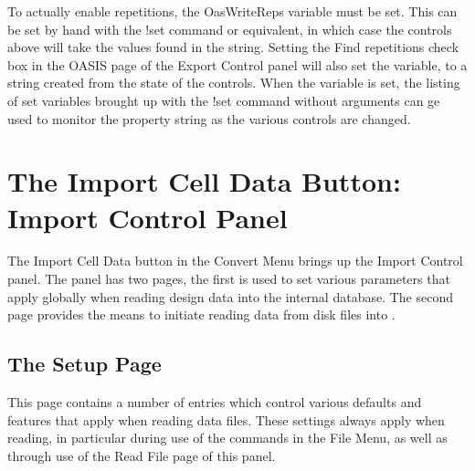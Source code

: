 To actually enable repetitions, the {\et OasWriteReps} variable must
be set.  This can be set by hand with the {\cb !set} command or
equivalent, in which case the controls above will take the values
found in the string.  Setting the {\cb Find repetitions} check box in
the {\cb OASIS} page of the {\cb Export Control} panel will also set
the variable, to a string created from the state of the controls. 
When the variable is set, the listing of set variables brought up with
the {\cb !set} command without arguments can ge used to monitor the
property string as the various controls are changed.


\section{The {\cb Import Cell Data} Button: {\cb Import Control} Panel}
\label{cvimport}

The {\cb Import Cell Data} button in the {\cb Convert Menu} brings
up the {\cb Import Control} panel.  The panel has two pages, the first
is used to set various parameters that apply globally when reading
design data into the {\Xic} internal database.  The second page
provides the means to initiate reading data from disk files into
{\Xic}.

\subsection{The {\cb Setup} Page}

This page contains a number of entries which control various defaults
and features that apply when reading data files.  These settings
always apply when reading, in particular during use of the commands in
the {\cb File Menu}, as well as through use of the {\cb Read File}
page of this panel.

